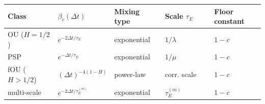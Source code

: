 \documentclass[12pt]{iopart}
\begin{document}
{\def\LTcaptype{none} %

\begin{center}\small
\begin{tabular}{@{} >{\raggedright\arraybackslash}p{0.2000\linewidth} >{\raggedright\arraybackslash}p{0.2000\linewidth} >{\raggedright\arraybackslash}p{0.2000\linewidth} >{\raggedright\arraybackslash}p{0.2000\linewidth} >{\raggedright\arraybackslash}p{0.2000\linewidth}@{}}
\toprule

\begin{minipage}[b]{\linewidth}\raggedright

Class

\end{minipage} & \begin{minipage}[b]{\linewidth}\raggedright

\(\beta_v(\Delta t)\)

\end{minipage} & \begin{minipage}[b]{\linewidth}\raggedright

Mixing type

\end{minipage} & \begin{minipage}[b]{\linewidth}\raggedright

Scale \(\tau_E\)

\end{minipage} & \begin{minipage}[b]{\linewidth}\raggedright

Floor constant

\end{minipage} \\

\midrule

\bottomrule

OU (\(H=1/2\)) & \(e^{-2\Delta t/\tau_E}\) & exponential & \(1/\lambda\) & \(1-c\) \\

PSP & \(e^{-\Delta t/\tau_E}\) & exponential & \(1/\mu\) & \(1-c\) \\

fOU (\(H>1/2\)) & \((\Delta t)^{-4(1-H)}\) & power-law & corr. scale & \(1-c\) \\

multi-scale & \(e^{-2\Delta t/\tau_E^{(m)}}\) & exponential & \(\tau_E^{(m)}\) & \(1-c\) \\

\end{tabular}
\end{center}
}
\end{document}
